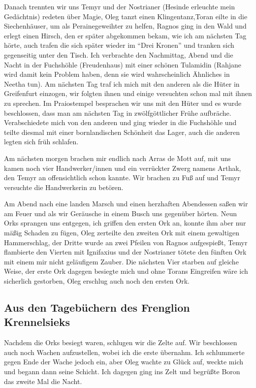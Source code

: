 Danach trennten wir uns Temyr und der Nostrianer (Hesinde erleuchte mein Gedächtnis) redeten über Magie, Oleg tanzt einen Klingentanz,Toran eilte in die Siechenhäuser, um als Perainegeweihter zu helfen, Ragnos ging in den Wald und erlegt einen Hirsch, den er später abgekommen bekam, wie ich am nächsten Tag hörte, auch trafen die sich später wieder im ``Drei Kronen'' und tranken sich gegenseitig unter den Tisch. Ich verbrachte den Nachmittag, Abend und die Nacht in der Fuchshöhle (Freudenhaus) mit einer schönen Tulamidin (Rahjane wird damit kein Problem haben, denn sie wird wahrscheinlich Ähnliches in Neetha tun). Am nächsten Tag traf ich mich mit den anderen als die Hüter in Greifenfurt einzogen, wir folgten ihnen und einige versuchten schon mal mit ihnen zu sprechen. Im Praiostempel besprachen wir uns mit den Hüter und es wurde beschlossen, dass man am nächsten Tag in zwölfgöttlicher Frühe aufbräche. Verabschiedete mich von den anderen und ging wieder in die Fuchshöhle und teilte diesmal mit einer bornlandischen Schönheit das Lager, auch die anderen legten sich früh schlafen.

Am nächsten morgen brachen mir endlich nach Arras de Mott auf, mit uns kamen noch vier Handwerker/innen und ein verrückter Zwerg namens Arthak, den Temyr an offensichtlich schon kannte. Wir brachen zu Fuß auf und Temyr versuchte die Handwerkerin zu betören.

Am Abend nach eine landen Marsch und einen herzhaften Abendessen saßen wir am Feuer und als wir Geräusche in einem Busch uns gegenüber hörten. Neun Orks sprangen uns entgegen, ich griffen den ersten Ork an, konnte ihm aber nur mäßig Schaden zu fügen, Oleg zerteilte den zweiten Ork mit einem gewaltigen Hammerschlag, der Dritte wurde an zwei Pfeilen von Ragnos aufgespießt, Temyr flambierte den Vierten mit Ignifaxius und der Nostrianer tötete den fünften Ork mit einem mir nicht geläufigem Zauber. Die nächsten Vier starben auf gleiche Weise, der erste Ork dagegen besiegte mich und ohne Torans Eingreifen wäre ich sicherlich gestorben, Oleg erschlug auch noch den ersten Ork.


\subsection{Aus den Tagebüchern des Frenglion Krennelsieks}

Nachdem die Orks besiegt waren, schlugen wir die Zelte auf. Wir beschlossen auch noch Wachen aufzustellen, wobei ich die erste übernahm. Ich schlummerte gegen Ende der Wache jedoch ein, aber Oleg wachte zu Glück auf, weckte mich und begann dann seine Schicht. Ich dagegen ging ins Zelt und begrüßte Boron das zweite Mal die Nacht.

